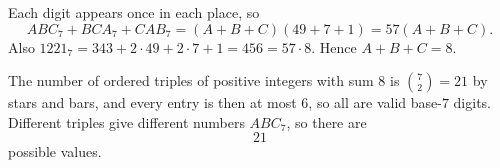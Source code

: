 Each digit appears once in each place, so
\[
ABC_7+BCA_7+CAB_7=(A+B+C)(49+7+1)=57(A+B+C).
\]
Also $1221_7=343+2\cdot49+2\cdot7+1=456=57\cdot8$. Hence $A+B+C=8$.

The number of ordered triples of positive integers with sum $8$ is $\binom72=21$ by stars and bars, and every entry is then at most $6$, so all are valid base-$7$ digits. Different triples give different numbers $ABC_7$, so there are
\[\boxed{21}\]
possible values.
